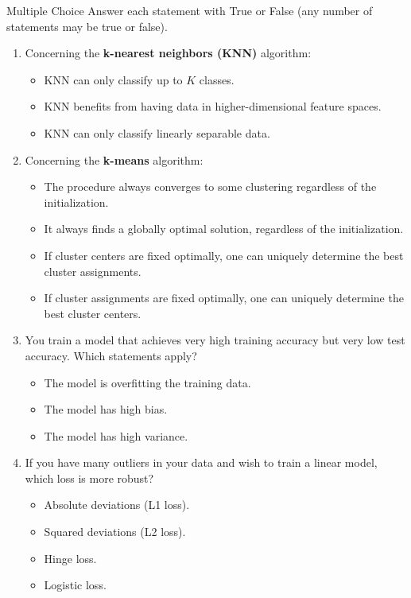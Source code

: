 \documentclass{article}
\begin{document}

\begin{exercise}{Multiple Choice}
  Answer each statement with True or False (any number of statements may be true or false).
  
  \begin{enumerate}
    \item Concerning the \textbf{k-nearest neighbors (KNN)} algorithm:
      \begin{itemize}
        \item KNN can only classify up to $K$ classes.
        \item KNN benefits from having data in higher-dimensional feature spaces.
        \item KNN can only classify linearly separable data.
      \end{itemize}

    \item Concerning the \textbf{k-means} algorithm:
      \begin{itemize}
        \item The procedure always converges to some clustering regardless of the initialization.
        \item It always finds a globally optimal solution, regardless of the initialization.
        \item If cluster centers are fixed optimally, one can uniquely determine the best cluster assignments.
        \item If cluster assignments are fixed optimally, one can uniquely determine the best cluster centers.
      \end{itemize}

    \item You train a model that achieves very high training accuracy but very low test accuracy. Which statements apply?
      \begin{itemize}
        \item The model is overfitting the training data.
        \item The model has high bias.
        \item The model has high variance.
      \end{itemize}

    \item If you have many outliers in your data and wish to train a linear model, which loss is more robust?
      \begin{itemize}
        \item Absolute deviations (L1 loss).
        \item Squared deviations (L2 loss).
        \item Hinge loss.
        \item Logistic loss.
      \end{itemize}


\end{enumerate}
\end{exercise}
\end{document}
